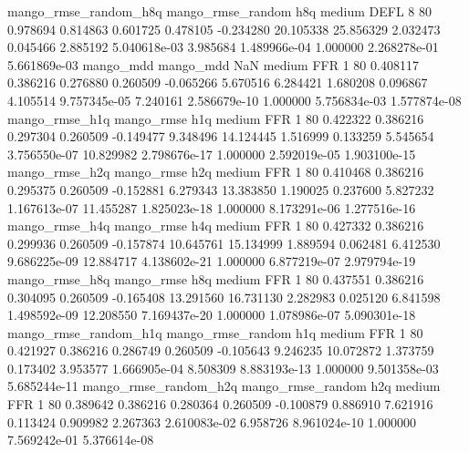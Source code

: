 mango_rmse_random_h8q mango_rmse_random                  h8q     medium     DEFL                 8 80  0.978694       0.814863 0.601725       0.478105   -0.234280     20.105338     25.856329     2.032473       0.045466  2.885192 5.040618e-03     3.985684   1.489966e-04            1.000000    2.268278e-01        5.661869e-03
            mango_mdd         mango_mdd                  NaN     medium      FFR                 1 80  0.408117       0.386216 0.276880       0.260509   -0.065266      5.670516      6.284421     1.680208       0.096867  4.105514 9.757345e-05     7.240161   2.586679e-10            1.000000    5.756834e-03        1.577874e-08
       mango_rmse_h1q        mango_rmse                  h1q     medium      FFR                 1 80  0.422322       0.386216 0.297304       0.260509   -0.149477      9.348496     14.124445     1.516999       0.133259  5.545654 3.756550e-07    10.829982   2.798676e-17            1.000000    2.592019e-05        1.903100e-15
       mango_rmse_h2q        mango_rmse                  h2q     medium      FFR                 1 80  0.410468       0.386216 0.295375       0.260509   -0.152881      6.279343     13.383850     1.190025       0.237600  5.827232 1.167613e-07    11.455287   1.825023e-18            1.000000    8.173291e-06        1.277516e-16
       mango_rmse_h4q        mango_rmse                  h4q     medium      FFR                 1 80  0.427332       0.386216 0.299936       0.260509   -0.157874     10.645761     15.134999     1.889594       0.062481  6.412530 9.686225e-09    12.884717   4.138602e-21            1.000000    6.877219e-07        2.979794e-19
       mango_rmse_h8q        mango_rmse                  h8q     medium      FFR                 1 80  0.437551       0.386216 0.304095       0.260509   -0.165408     13.291560     16.731130     2.282983       0.025120  6.841598 1.498592e-09    12.208550   7.169437e-20            1.000000    1.078986e-07        5.090301e-18
mango_rmse_random_h1q mango_rmse_random                  h1q     medium      FFR                 1 80  0.421927       0.386216 0.286749       0.260509   -0.105643      9.246235     10.072872     1.373759       0.173402  3.953577 1.666905e-04     8.508309   8.883193e-13            1.000000    9.501358e-03        5.685244e-11
mango_rmse_random_h2q mango_rmse_random                  h2q     medium      FFR                 1 80  0.389642       0.386216 0.280364       0.260509   -0.100879      0.886910      7.621916     0.113424       0.909982  2.267363 2.610083e-02     6.958726   8.961024e-10            1.000000    7.569242e-01        5.376614e-08

